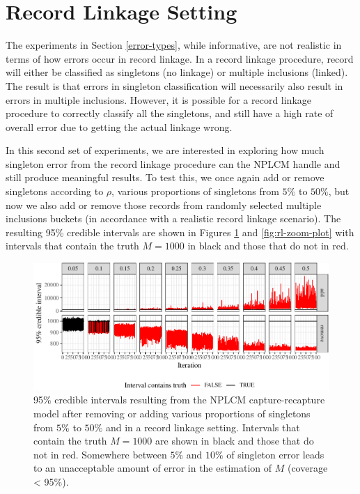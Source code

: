 \documentclass[]{article}
\begin{document}
\hypertarget{record-linkage-setting}{%
\section{Record Linkage Setting}\label{record-linkage-setting}}

The experiments in Section \ref{error-types}, while informative, are not
realistic in terms of how errors occur in record linkage. In a record
linkage procedure, record will either be classified as singletons (no
linkage) or multiple inclusions (linked). The result is that errors in
singleton classification will necessarily also result in errors in
multiple inclusions. However, it is possible for a record linkage
procedure to correctly classify all the singletons, and still have a
high rate of overall error due to getting the actual linkage wrong.

In this second set of experiments, we are interested in exploring how
much singleton error from the record linkage procedure can the NPLCM
handle and still produce meaningful results. To test this, we once again
add or remove singletons according to \(\rho\), various proportions of
singletons from \(5\%\) to \(50\%\), but now we also add or remove those
records from randomly selected multiple inclusions buckets (in
accordance with a realistic record linkage scenario). The resulting 95\%
credible intervals are shown in Figures \ref{fig:rl-plot} and
\ref{fig:rl-zoom-plot} with intervals that contain the truth
\(M = 1000\) in black and those that do not in red.

\begin{figure}
\centering
\includegraphics{singleton_errors_files/figure-latex/rl-plot-1.pdf}
\caption{\label{fig:rl-plot}95\% credible intervals resulting from the
NPLCM capture-recapture model after removing or adding various
proportions of singletons from \(5\%\) to \(50\%\) and in a record
linkage setting. Intervals that contain the truth \(M = 1000\) are shown
in black and those that do not in red. Somewhere between \(5\%\) and
\(10\%\) of singleton error leads to an unacceptable amount of error in
the estimation of \(M\) (coverage \textless{} 95\%).}
\end{figure}
\end{document}
